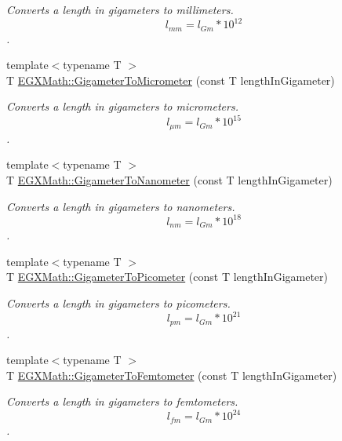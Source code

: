 \begin{DoxyCompactItemize}
\begin{DoxyCompactList}\small\item\em Converts a length in gigameters to millimeters. \[ l_{mm}=l_{Gm} * 10^{12} \]. \end{DoxyCompactList}\item 
{\footnotesize template$<$typename T $>$ }\\T \mbox{\hyperlink{group___e_g_x_math-_conversions-_length_conversions-_gigameter-_s_i_ga02f73d15581b1cd69a79b843186211f5}{E\+G\+X\+Math\+::\+Gigameter\+To\+Micrometer}} (const T length\+In\+Gigameter)
\begin{DoxyCompactList}\small\item\em Converts a length in gigameters to micrometers. \[ l_{\mu m}=l_{Gm} * 10^{15} \]. \end{DoxyCompactList}\item 
{\footnotesize template$<$typename T $>$ }\\T \mbox{\hyperlink{group___e_g_x_math-_conversions-_length_conversions-_gigameter-_s_i_ga6538a7007f104833aa7ad690156342b5}{E\+G\+X\+Math\+::\+Gigameter\+To\+Nanometer}} (const T length\+In\+Gigameter)
\begin{DoxyCompactList}\small\item\em Converts a length in gigameters to nanometers. \[ l_{nm}=l_{Gm} * 10^{18} \]. \end{DoxyCompactList}\item 
{\footnotesize template$<$typename T $>$ }\\T \mbox{\hyperlink{group___e_g_x_math-_conversions-_length_conversions-_gigameter-_s_i_gae9cea35a0ce747d02ec8b6cf7bfeaa7e}{E\+G\+X\+Math\+::\+Gigameter\+To\+Picometer}} (const T length\+In\+Gigameter)
\begin{DoxyCompactList}\small\item\em Converts a length in gigameters to picometers. \[ l_{pm}=l_{Gm} * 10^{21} \]. \end{DoxyCompactList}\item 
{\footnotesize template$<$typename T $>$ }\\T \mbox{\hyperlink{group___e_g_x_math-_conversions-_length_conversions-_gigameter-_s_i_ga6701fe7aa809ca67fef5d4f9bf7b241c}{E\+G\+X\+Math\+::\+Gigameter\+To\+Femtometer}} (const T length\+In\+Gigameter)
\begin{DoxyCompactList}\small\item\em Converts a length in gigameters to femtometers. \[ l_{fm}=l_{Gm} * 10^{24} \]. \end{DoxyCompactList}\item 

\end{DoxyCompactItemize}
